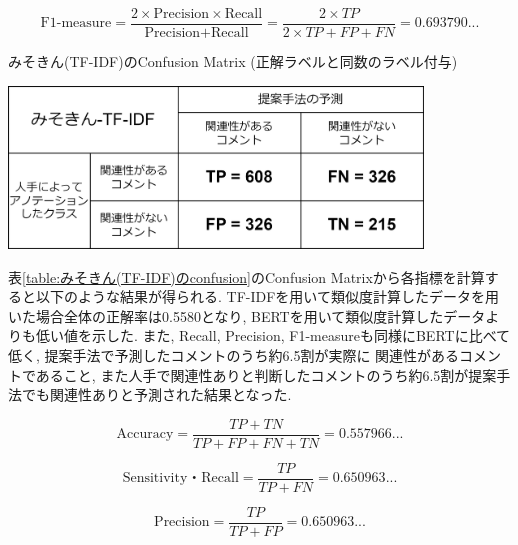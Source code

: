 \documentclass{ltjarticle}
\begin{document}
\begin{equation}
    \textrm{F1-measure} = \dfrac{2\times \textrm{Precision}\times \textrm{Recall}}{\textrm{Precision}+\textrm{Recall}} = \dfrac{2\times TP}{2\times TP+FP+FN} = 0.693790...
\end{equation}
\vspace{10truept}

\begin{table}[ht]
    \centering
    \caption{みそきん(TF-IDF)のConfusion Matrix (正解ラベルと同数のラベル付与)}
    \vspace{5truept}

    \includegraphics[width = 11cm]{images/みそきん行列tf-idf.drawio.png}
    \label{table:みそきん(TF-IDF)のconfusion}
\end{table}

\newpage
表\ref{table:みそきん(TF-IDF)のconfusion}のConfusion Matrixから各指標を計算すると以下のような結果が得られる. 
TF-IDFを用いて類似度計算したデータを用いた場合全体の正解率は0.5580となり, BERTを用いて類似度計算したデータよりも低い値を示した. 
また, Recall, Precision, F1-measureも同様にBERTに比べて低く, 提案手法で予測したコメントのうち約6.5割が実際に
関連性があるコメントであること, また人手で関連性ありと判断したコメントのうち約6.5割が提案手法でも関連性ありと予測された結果となった. 
\vspace{10truept}

\begin{equation}
    \textrm{Accuracy} = \dfrac{TP+TN}{TP+FP+FN+TN} = 0.557966...
\end{equation}
\vspace{5truept}

\begin{equation}
    \textrm{Sensitivity・Recall} = \dfrac{TP}{TP+FN} = 0.650963...
\end{equation}
\vspace{5truept}

\begin{equation}
    \textrm{Precision} = \dfrac{TP}{TP+FP} = 0.650963...
\end{equation}
\vspace{5truept}
\end{document}
